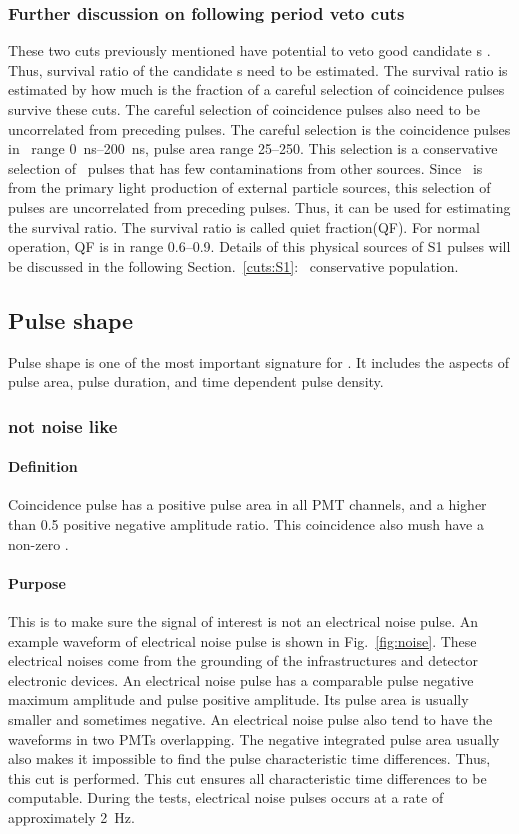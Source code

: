 \subsubsection{Further discussion on following period veto cuts}
These two cuts previously mentioned have potential to veto good candidate \eep s . Thus, survival ratio of the candidate \eep s need to be estimated. The survival ratio is estimated by how much is the fraction of a careful selection of coincidence pulses survive these cuts.
The careful selection of coincidence pulses also need to be uncorrelated from preceding pulses. The careful selection is the coincidence pulses in \ttwoseven\ range \SIrange{0}{200}{\ns},  pulse area range \SIrange{25}{250}{\phe}. This selection is a conservative selection of \sone\ pulses that has few contaminations from other sources. Since \sone\ is from the primary light production of external particle sources, this selection of pulses are uncorrelated from preceding pulses. Thus, it can be used for estimating the survival ratio. The survival ratio is called quiet fraction(QF). For normal operation, QF is in range \numrange{0.6}{0.9}. Details of this physical sources of S1 pulses will be discussed in the following Section.~\ref{cuts:S1}: \sone\ conservative population. 

\subsection{Pulse shape}
Pulse shape is one of the most important signature for \eep . It includes the aspects of pulse area, pulse duration, and time dependent pulse density.   

\subsubsection{not noise like}

\paragraph{Definition}
Coincidence pulse has a positive pulse area in all PMT channels, and a higher than \num{0.5} positive negative amplitude ratio. This coincidence also mush have a non-zero \ttenninety.

\paragraph{Purpose}
This is to make sure the signal of interest is not an electrical noise pulse. 
An example waveform of electrical noise pulse is shown in Fig.~\ref{fig:noise}. 
These electrical noises come from the grounding of the infrastructures and detector electronic devices. 
An electrical noise pulse has a comparable pulse negative maximum amplitude and pulse positive amplitude. Its pulse area is usually smaller and sometimes negative.  
An electrical noise pulse also tend to have the waveforms in two PMTs overlapping. 
The negative integrated pulse area usually also makes it impossible to find the pulse characteristic time differences. 
Thus, this cut is performed. This cut ensures all characteristic time differences to be computable. 
During the tests, electrical noise pulses occurs at a rate of approximately \SI{2}{\Hz}. 

